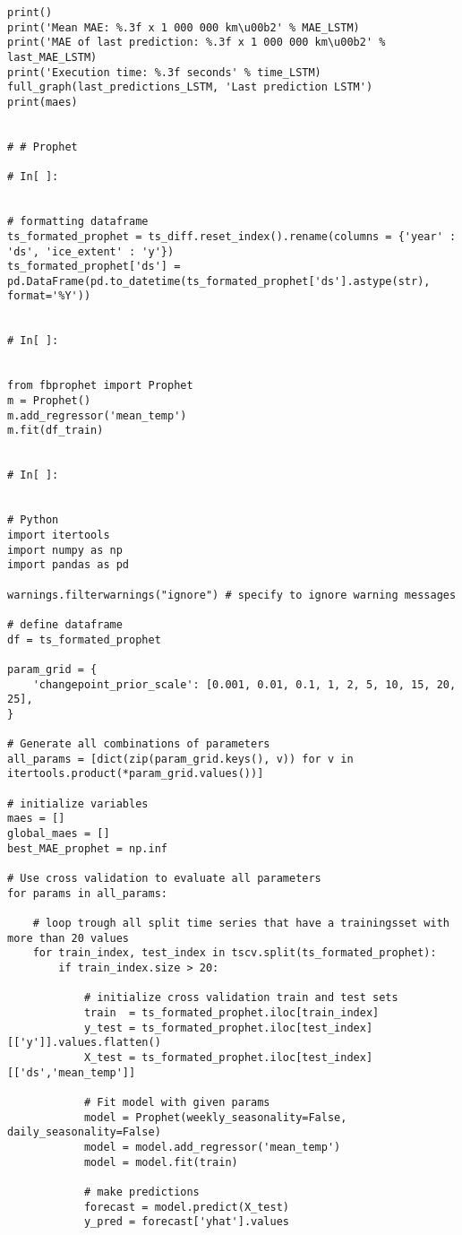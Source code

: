 \begin{verbatim}
print()
print('Mean MAE: %.3f x 1 000 000 km\u00b2' % MAE_LSTM)
print('MAE of last prediction: %.3f x 1 000 000 km\u00b2' % last_MAE_LSTM)
print('Execution time: %.3f seconds' % time_LSTM)
full_graph(last_predictions_LSTM, 'Last prediction LSTM')
print(maes)


# # Prophet

# In[ ]:


# formatting dataframe
ts_formated_prophet = ts_diff.reset_index().rename(columns = {'year' : 'ds', 'ice_extent' : 'y'})
ts_formated_prophet['ds'] = pd.DataFrame(pd.to_datetime(ts_formated_prophet['ds'].astype(str), format='%Y'))


# In[ ]:


from fbprophet import Prophet
m = Prophet()
m.add_regressor('mean_temp')
m.fit(df_train)


# In[ ]:


# Python
import itertools
import numpy as np
import pandas as pd

warnings.filterwarnings("ignore") # specify to ignore warning messages

# define dataframe
df = ts_formated_prophet

param_grid = {  
    'changepoint_prior_scale': [0.001, 0.01, 0.1, 1, 2, 5, 10, 15, 20, 25],
}

# Generate all combinations of parameters
all_params = [dict(zip(param_grid.keys(), v)) for v in itertools.product(*param_grid.values())]

# initialize variables
maes = []  
global_maes = []
best_MAE_prophet = np.inf

# Use cross validation to evaluate all parameters
for params in all_params:

    # loop trough all split time series that have a trainingsset with more than 20 values
    for train_index, test_index in tscv.split(ts_formated_prophet):    
        if train_index.size > 20:  

            # initialize cross validation train and test sets
            train  = ts_formated_prophet.iloc[train_index]
            y_test = ts_formated_prophet.iloc[test_index][['y']].values.flatten()
            X_test = ts_formated_prophet.iloc[test_index][['ds','mean_temp']]

            # Fit model with given params
            model = Prophet(weekly_seasonality=False, daily_seasonality=False)
            model = model.add_regressor('mean_temp')
            model = model.fit(train)

            # make predictions
            forecast = model.predict(X_test)
            y_pred = forecast['yhat'].values


\end{verbatim}
